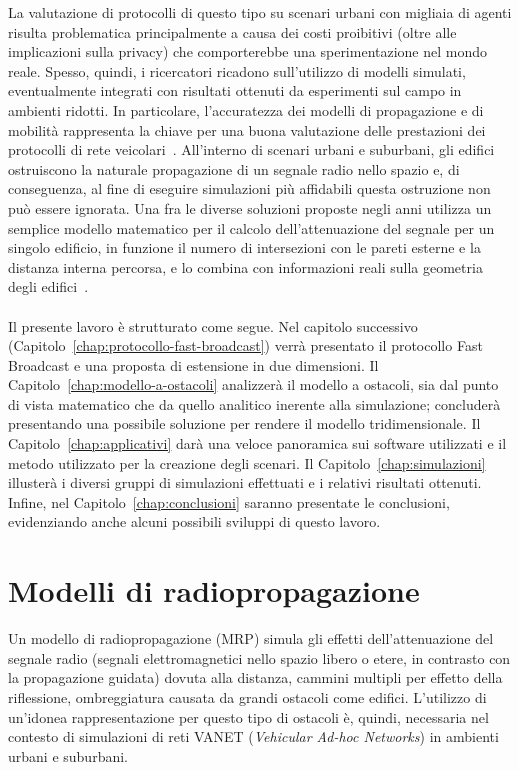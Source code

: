 La valutazione di protocolli di questo tipo su scenari urbani con migliaia di agenti risulta
problematica principalmente a causa dei costi proibitivi (oltre alle implicazioni sulla privacy)
che comporterebbe una sperimentazione nel mondo reale.
Spesso, quindi, i ricercatori ricadono sull'utilizzo di modelli simulati, eventualmente integrati con risultati ottenuti
da esperimenti sul campo in ambienti ridotti.
In particolare, l'accuratezza dei modelli di propagazione e di mobilità rappresenta la chiave per una buona valutazione delle prestazioni
dei protocolli di rete veicolari~\cite{4020783}.
All'interno di scenari urbani e suburbani, gli edifici ostruiscono la naturale propagazione di un segnale radio nello spazio
e, di conseguenza, al fine di eseguire simulazioni più affidabili questa ostruzione non può essere ignorata.
Una fra le diverse soluzioni proposte negli anni utilizza un semplice modello matematico
per il calcolo dell'attenuazione del segnale per un singolo edificio,
in funzione il numero di intersezioni con le pareti esterne e la distanza interna percorsa,
e lo combina con informazioni reali sulla geometria degli edifici~\cite{Carpenter:2015:OMI:2756509.2756512}.

\paragraph{}
Il presente lavoro è strutturato come segue.
Nel capitolo successivo (Capitolo~\ref{chap:protocollo-fast-broadcast}) verrà presentato il protocollo Fast Broadcast e una proposta di estensione in due dimensioni.
Il Capitolo~\ref{chap:modello-a-ostacoli} analizzerà il modello a ostacoli, sia dal punto di vista matematico che da quello analitico inerente alla simulazione;
concluderà presentando una possibile soluzione per rendere il modello tridimensionale.
Il Capitolo~\ref{chap:applicativi} darà una veloce panoramica sui software utilizzati e il metodo utilizzato per la creazione degli scenari.
Il Capitolo~\ref{chap:simulazioni} illusterà i diversi gruppi di simulazioni effettuati e i relativi risultati ottenuti.
Infine, nel Capitolo~\ref{chap:conclusioni} saranno presentate le conclusioni, evidenziando anche alcuni possibili sviluppi di questo lavoro.
%
\section{Modelli di radiopropagazione}\label{sec:modelli-propagazione}
Un modello di radiopropagazione (MRP) simula gli effetti dell'attenuazione del segnale radio (segnali elettromagnetici nello spazio libero o etere, in contrasto con la propagazione guidata)
dovuta alla distanza, cammini multipli per effetto della riflessione, ombreggiatura causata da grandi ostacoli come edifici.
L'utilizzo di un'idonea rappresentazione per questo tipo di ostacoli è, quindi, necessaria nel contesto di simulazioni di reti VANET (\textit{Vehicular Ad-hoc Networks}) in ambienti urbani
e suburbani.

